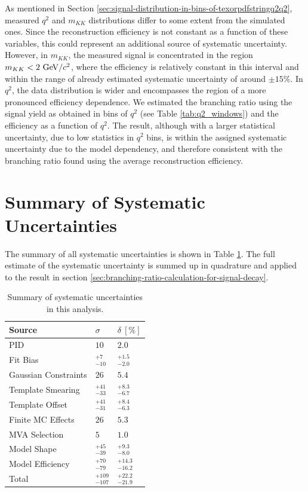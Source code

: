 As mentioned in Section \ref{sec:signal-distribution-in-bins-of-texorpdfstringq2q2}, measured $q^2$ and $m_{KK}$ distributions differ to some extent from the simulated ones. Since the reconstruction efficiency is not constant as a function of these variables, this could represent an additional source of systematic uncertainty. However, in $m_{KK}$, the measured signal is concentrated in the region $m_{KK}<2\mathrm{~GeV}/c^2$, where the efficiency is relatively constant in this interval and within the range of already estimated systematic uncertainty of around $\pm15\%$. In $q^2$, the data distribution is wider and encompasses the region of a more pronounced efficiency dependence. We estimated the branching ratio using the signal yield as obtained in bins of $q^2$ (see Table \ref{tab:q2_windows}) and the efficiency as a function of $q^2$. The result, although with a larger statistical uncertainty, due to low statistics in $q^2$ bins, is within the assigned systematic uncertainty due to the model dependency, and therefore consistent with the branching ratio found using the average reconstruction efficiency.

\section{Summary of Systematic Uncertainties}

The summary of all systematic uncertainties is shown in Table \ref{tab:sys_summary}. The full estimate of the systematic uncertainty is summed up in quadrature and applied to the result in section \ref{sec:branching-ratio-calculation-for-signal-decay}.


\begin{table}[H]
	\centering
	\begin{tabular}{l|l|l}
		Source & $\sigma$ & $\delta~[\%]$ \\
		\toprule
		PID & $10$ & $2.0$ \\
		Fit Bias & $ {}^{+7}_{-10}$ & ${}^{+1.5}_{-2.0}$ \\
		Gaussian Constraints & $26$ & $5.4$ \\
		Template Smearing & ${}^{+41}_{-33}$ & ${}^{+8.3}_{-6.7}$ \\
		Template Offset & ${}^{+41}_{-31}$ & ${}^{+8.4}_{-6.3}$ \\
		Finite MC Effects & $26$ & $5.3$ \\
		MVA Selection & $5$ & $1.0$\\
		Model Shape & ${}^{+45}_{-39}$ & ${}^{+9.3}_{-8.0}$ \\
		Model Efficiency & ${}^{+70}_{-79}$ & ${}^{+14.3}_{-16.2}$ \\
		\midrule
		Total & ${} ^{+109}_{-107}$ & ${}^{+22.2}_{-21.9}$ \\
		\bottomrule
	\end{tabular}
	\captionsetup{width=0.8\linewidth}
	\caption{Summary of systematic uncertainties in this analysis.}
	\label{tab:sys_summary}
\end{table}







